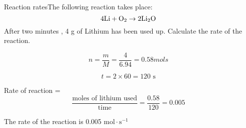\begin{wex}{Reaction rates}{The following reaction takes place: 
$$\rm{4Li + O_{2} \rightarrow 2Li_{2}O}$$
After two minutes , 4 g of Lithium has been used up. Calculate the rate of the reaction.}
{

\begin{equation*}
n = \frac{m}{M} = \frac{4}{6.94} = 0.58 mols 
\end{equation*}

\begin{equation*}
t = 2 \times 60 = 120 \text{ s}
\end{equation*}

Rate of reaction = \begin{equation*} \frac{\text{moles of lithium  used}}{\text{time}} = \frac{0.58}{120} = 0.005\end{equation*} 

The rate of the reaction is 0.005 $\text{mol} \cdot \text{s}^{-1}$
}\end{wex}

